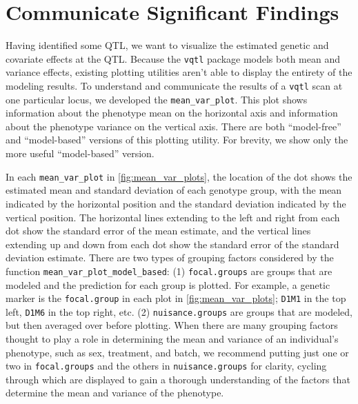 \documentclass[9pt,twocolumn,twoside]{gsag3jnl}
\begin{document}
\section*{Communicate Significant Findings}

Having identified some QTL, we want to visualize the estimated genetic and covariate effects at the QTL.
Because the \texttt{vqtl} package models both mean and variance effects, existing plotting utilities aren't able to display the entirety of the modeling results.
To understand and communicate the results of a \texttt{vqtl} scan at one particular locus, we developed the \texttt{mean\_var\_plot}.
This plot shows information about the phenotype mean on the horizontal axis and information about the phenotype variance on the vertical axis.
There are both ``model-free'' and ``model-based'' versions of this plotting utility.
For brevity, we show only the more useful ``model-based'' version.

In each \texttt{mean\_var\_plot} in \autoref{fig:mean_var_plots}, the location of the dot shows the estimated mean and standard deviation of each genotype group, with the mean indicated by the horizontal position and the standard deviation indicated by the vertical position.
The horizontal lines extending to the left and right from each dot show the standard error of the mean estimate, and the vertical lines extending up and down from each dot show the standard error of the standard deviation estimate.
There are two types of grouping factors considered by the function \texttt{mean\_var\_plot\_model\_based}:
(1) \texttt{focal.groups} are groups that are modeled and the prediction for each group is plotted.
For example, a genetic marker is the \texttt{focal.group} in each plot in \autoref{fig:mean_var_plots}; \texttt{D1M1} in the top left, \texttt{D1M6} in the top right, etc.
(2) \texttt{nuisance.groups} are groups that are modeled, but then averaged over before plotting.
When there are many grouping factors thought to play a role in determining the mean and variance of an individual's phenotype, such as sex, treatment, and batch, we recommend putting just one or two in \texttt{focal.groups} and the others in \texttt{nuisance.groups} for clarity, cycling through which are displayed to gain a thorough understanding of the factors that determine the mean and variance of the phenotype.


\end{document}
